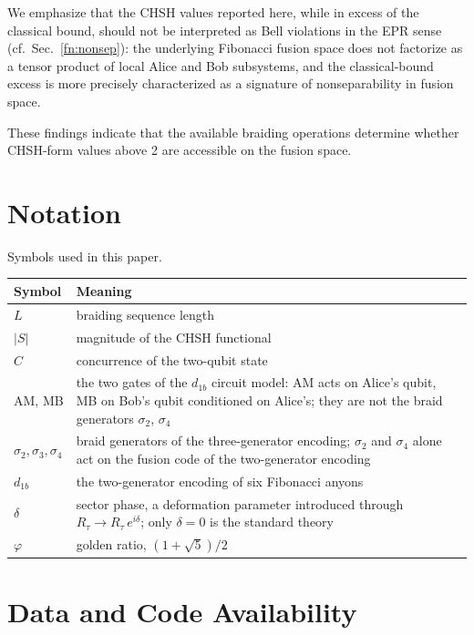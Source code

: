 \documentclass[aps,pra,twocolumn,superscriptaddress,longbibliography,floatfix,nofootinbib]{revtex4-2}
\begin{document}
We emphasize that the CHSH values reported here, while in excess of the
classical bound, should not be interpreted as Bell violations in
the EPR sense (cf.\ Sec.~\ref{fn:nonsep}): the underlying Fibonacci
fusion space does not factorize as a tensor product of local Alice and
Bob subsystems, and the classical-bound excess is more precisely
characterized as a signature of nonseparability in fusion space.

These findings indicate that the available braiding operations determine
whether CHSH-form values above 2 are accessible on the fusion space.

\section*{Notation}
\noindent Symbols used in this paper.
\small
\begin{ruledtabular}
\begin{tabular}{l p{}}
Symbol & Meaning \\
\hline
$L$ & braiding sequence length \\
$|S|$ & magnitude of the CHSH functional \\
$C$ & concurrence of the two-qubit state \\
$\mathrm{AM},\,\mathrm{MB}$ & the two gates of the $d_{1b}$ circuit model: AM acts on Alice's qubit, MB on Bob's qubit conditioned on Alice's; they are not the braid generators $\sigma_2$, $\sigma_4$ \\
$\sigma_2,\sigma_3,\sigma_4$ & braid generators of the three-generator encoding; $\sigma_2$ and $\sigma_4$ alone act on the fusion code of the two-generator encoding \\
$d_{1b}$ & the two-generator encoding of six Fibonacci anyons \\
$\delta$ & sector phase, a deformation parameter introduced through $R_\tau\to R_\tau\,e^{i\delta}$; only $\delta=0$ is the standard theory \\
$\varphi$ & golden ratio, $(1+\sqrt5)/2$ \\
\end{tabular}
\end{ruledtabular}

\section*{Data and Code Availability}
\end{document}
